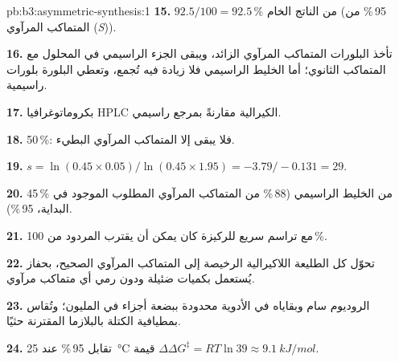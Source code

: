 \begin{solution}{pb:b3:asymmetric-synthesis:1}
\textbf{15.} $92.5/100 = 92.5$\,\% من الناتج الخام (95\,\% من المتماكب المرآوي (\textit{S})).

\textbf{16.} تأخذ البلورات المتماكب المرآوي الزائد، ويبقى الجزء الراسيمي في
المحلول مع المتماكب الثانوي؛ أما الخليط الراسيمي فلا زيادة فيه تُجمع، 
وتعطي البلورة بلورات راسيمية.

\textbf{17.} بكروماتوغرافيا HPLC الكيرالية مقارنةً بمرجع راسيمي.

\textbf{18.} 50\,\%: فلا يبقى إلا المتماكب المرآوي البطيء.

\textbf{19.} $s = \ln(0.45 \times 0.05)/\ln(0.45 \times 1.95) = -3.79/-0.131 = 29$.

\textbf{20.} 45\,\% من الخليط الراسيمي (88\,\% من المتماكب المرآوي المطلوب الموجود في البداية،
 95\,\%).

\textbf{21.} مع تراسم سريع للركيزة كان يمكن أن يقترب المردود من 100\,\%.

\textbf{22.} تحوّل كل الطليعة اللاكيرالية الرخيصة إلى المتماكب المرآوي الصحيح،
بحفاز يُستعمل بكميات ضئيلة ودون رمي أي متماكب مرآوي.

\textbf{23.} الروديوم سام وبقاياه في الأدوية محدودة ببضعة أجزاء في
المليون؛ وتُقاس بمطيافية الكتلة بالبلازما المقترنة حثيًا.

\textbf{24.} تقابل  95\,\% عند \qty{25}{\celsius} قيمة $\Delta\Delta G^\ddagger = RT\ln 39 \approx \qty{9.1}{kJ/mol}$.
\end{solution}
